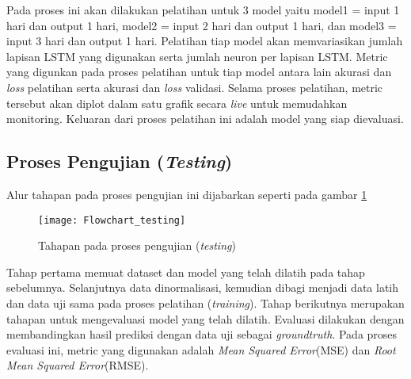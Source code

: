 \documentclass[../thesis.tex]{subfiles}
\begin{document}
Pada proses ini akan dilakukan pelatihan untuk 3 model yaitu model1 = input 1 hari dan output 1 hari, model2 = input 2 hari dan output 1 hari, dan model3 = input 3 hari dan output 1 hari. Pelatihan tiap model akan memvariasikan jumlah lapisan LSTM yang digunakan serta jumlah neuron per lapisan LSTM. 
Metric yang digunkan pada proses pelatihan untuk tiap model antara lain akurasi dan \textit{loss} pelatihan serta akurasi dan \textit{loss} validasi. Selama proses pelatihan, metric tersebut akan diplot dalam satu grafik secara \textit{live} untuk memudahkan monitoring. Keluaran dari proses pelatihan ini adalah model yang siap dievaluasi.

\subsection{Proses Pengujian (\textit{Testing})}
Alur tahapan pada proses pengujian ini dijabarkan seperti pada gambar \ref{lstm_testing}
\begin{figure}[t]
	\centering
	\texttt{[image: Flowchart\_testing]}
	\caption{Tahapan pada proses pengujian (\textit{testing})}
	\label{lstm_testing}
\end{figure}
Tahap pertama memuat dataset dan model yang telah dilatih pada tahap sebelumnya. Selanjutnya data dinormalisasi, kemudian dibagi menjadi data latih dan data uji sama pada proses pelatihan (\textit{training}).
Tahap berikutnya merupakan tahapan untuk mengevaluasi model yang telah dilatih. Evaluasi dilakukan dengan membandingkan hasil prediksi dengan data uji sebagai \textit{groundtruth}. Pada proses evaluasi ini, metric yang digunakan adalah \textit{Mean Squared Error}(MSE) dan \textit{Root Mean Squared Error}(RMSE). 
\end{document}
